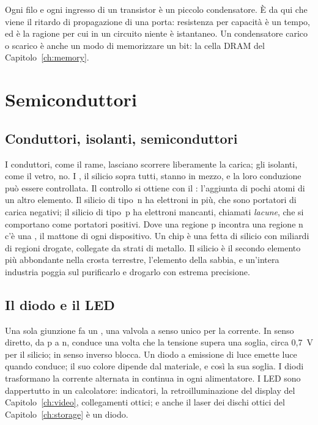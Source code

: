 Ogni filo e ogni ingresso di un transistor è un piccolo condensatore. È da qui
che viene il ritardo di propagazione di una porta: resistenza per capacità è un
tempo, ed è la ragione per cui in un circuito niente è istantaneo. Un
condensatore carico o scarico è anche un modo di memorizzare un bit: la cella
DRAM del Capitolo~\ref{ch:memory}.

\section{Semiconduttori}

\subsection{Conduttori, isolanti, semiconduttori}

I conduttori, come il rame, lasciano scorrere liberamente la carica; gli
isolanti, come il vetro, no. I , il silicio sopra tutti,
stanno in mezzo, e la loro conduzione può essere controllata. Il controllo si
ottiene con il : l'aggiunta di pochi atomi di un altro
elemento. Il silicio di tipo~n ha elettroni in più, che sono portatori di
carica negativi; il silicio di tipo~p ha elettroni mancanti, chiamati
\emph{lacune}, che si comportano come portatori positivi. Dove una regione p
incontra una regione n c'è una , il mattone di ogni
dispositivo. Un chip è una fetta di silicio con miliardi di regioni drogate,
collegate da strati di metallo. Il silicio è il secondo elemento più abbondante
nella crosta terrestre, l'elemento della sabbia, e un'intera industria poggia
sul purificarlo e drogarlo con estrema precisione.

\subsection{Il diodo e il LED}

Una sola giunzione fa un , una valvola a senso unico per la
corrente. In senso diretto, da p a n, conduce una volta che la tensione supera
una soglia, circa 0,7~V per il silicio; in senso inverso blocca. Un diodo a
emissione di luce emette luce quando conduce; il suo colore dipende dal
materiale, e così la sua soglia. I diodi trasformano la corrente alternata in
continua in ogni alimentatore. I LED sono dappertutto in un calcolatore:
indicatori, la retroilluminazione del display del Capitolo~\ref{ch:video},
collegamenti ottici; e anche il laser dei dischi ottici del
Capitolo~\ref{ch:storage} è un diodo.

